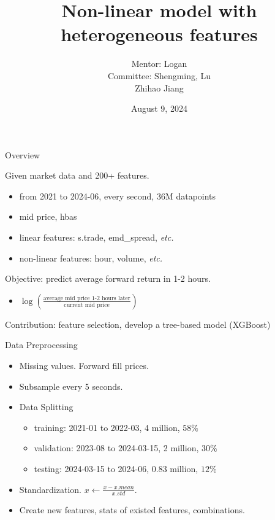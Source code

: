 \documentclass[9pt]{beamer}
\title[]{Non-linear model with heterogeneous features} %
\author{
{ \footnotesize
Mentor: Logan\\
Committee: Shengming, Lu
}
\\
\vspace{5mm}
Zhihao Jiang
}
\date{August 9, 2024}
\begin{document}
\frame{\titlepage}






\begin{frame}{Overview}


Given market data and 200+ features.
\begin{itemize}
    \item from 2021 to 2024-06, every second, 36M datapoints
    \item mid price, hbas
    \item linear features: s.trade, emd\_spread, \emph{etc.}
    \item non-linear features: hour, volume, \emph{etc.}
\end{itemize}

Objective: predict average forward return in 1-2 hours.
\begin{itemize}
    \item $\log\left(\frac{\text{average mid price 1-2 hours later}}{\text{current mid price}}\right)$
\end{itemize}

Contribution: feature selection, develop a tree-based model (XGBoost)



\end{frame}


\begin{frame}{Data Preprocessing}

\begin{itemize}
    \item Missing values. Forward fill prices.

    \item Subsample every 5 seconds.

    \item Data Splitting
    \begin{itemize}
        \item training: 2021-01 to 2022-03, 4 million, $58\%$
        \item validation: 2023-08 to 2024-03-15, 2 million, $30\%$
        \item testing: 2024-03-15 to 2024-06, 0.83 million, $12\%$
    \end{itemize}

    \item Standardization. $x\leftarrow \frac{x-x.mean}{x.std}$.

    \item Create new features, stats of existed features, combinations.
\end{itemize}


\end{frame}
\end{document}
